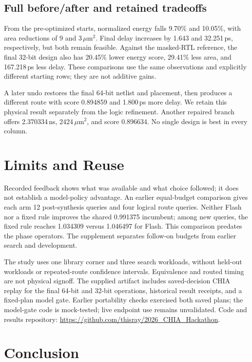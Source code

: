 \documentclass[conference,10pt]{IEEEtran}
\begin{document}
\subsection{Full before/after and retained tradeoffs}

From the pre-optimized starts, normalized energy falls 9.70\% and 10.05\%, with area reductions of 9 and 3\,$\mu$m$^2$. Final delay increases by 1.643 and 32.251\,ps, respectively, but both remain feasible. Against the masked-RTL reference, the final 32-bit design also has 20.45\% lower energy score, 29.41\% less area, and 167.218\,ps less delay. These comparisons use the same observations and explicitly different starting rows; they are not additive gains.

A later undo restores the final 64-bit netlist and placement, then produces a different route with score 0.894859 and 1.800\,ps more delay. We retain this physical result separately from the logic refinement. Another repaired branch offers 2.370334\,ns, 2424\,$\mu$m$^2$, and score 0.896634. No single design is best in every column.

\section{Limits and Reuse}

Recorded feedback shows what was available and what choice followed; it does not establish a model-policy advantage. An earlier equal-budget comparison gives each arm 12 post-synthesis queries and four logical route queries. Neither Flash nor a fixed rule improves the shared 0.991375 incumbent; among new queries, the fixed rule reaches 1.034309 versus 1.046497 for Flash. This comparison predates the phase operators. The supplement separates follow-on budgets from earlier search and development.

The study uses one library corner and three search workloads, without held-out workloads or repeated-route confidence intervals. Equivalence and routed timing are not physical signoff. The supplied artifact includes saved-decision CHIA replay for the final 64-bit and 32-bit operations, historical result receipts, and a fixed-plan model gate. Earlier portability checks exercised both saved plans; the model-gate code is mock-tested; live endpoint use remains unvalidated. Code and results repository: \url{https://github.com/thisray/2026_CHIA_Hackathon}.
\section{Conclusion}
\end{document}
